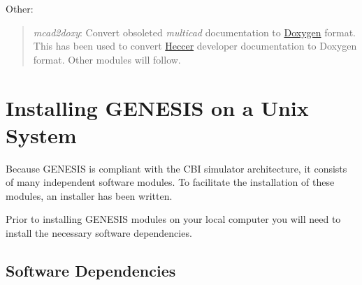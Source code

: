 \documentclass[12pt]{article}
\begin{document}
Other:
\begin{quote}
\item {\it mcad2doxy}: Convert obsoleted {\it multicad} documentation to \href{http://www.stack.nl/~dimitri/doxygen/}{Doxygen} format. This has been used to convert \href{../heccer/heccer.tex}{Heccer} developer documentation to Doxygen format. Other modules will follow. 
\end{quote}

\section*{Installing GENESIS on a Unix System}

Because GENESIS is compliant with the CBI simulator architecture, it consists of many independent software modules. To facilitate the installation of these modules, an installer has been written.

Prior to installing GENESIS modules on your local computer you will need to install the necessary software dependencies.

\subsection*{Software Dependencies}
\end{document}
